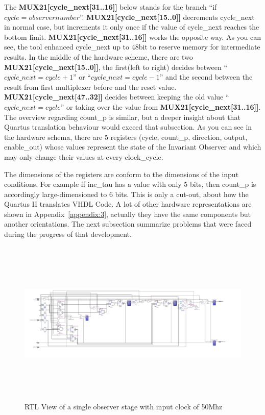 The \textbf{MUX21[cycle\_next[31..16]]} below stands for the branch ``if $cycle=observernumber$''. 
\textbf{MUX21[cycle\_next[15..0]]} decrements cycle\_next in normal case, but increments it only once if the value of cycle\_next reaches the bottom limit. 
\textbf{MUX21[cycle\_next[31..16]]} works the opposite way. 
As you can see, the tool enhanced cycle\_next up to 48bit to reserve memory for intermediate results.
In the middle of the hardware scheme, there are two \textbf{MUX21[cycle\_next[15..0]]}, 
the first(left to right) decides between  ``$cycle\_next=cycle+1$'' or ``$cycle\_next=cycle-1$'' and the second 
between the result from first multiplexer before and the reset value. \textbf{MUX21[cycle\_next[47..32]]} decides between keeping the old value ``$cycle\_next=cycle$'' or 
taking over the value from \textbf{MUX21[cycle\_next[31..16]]}. 
The overview regarding count\_p is similar, but a deeper insight about that Quartus translation behaviour would exceed that subsection. 
As you can see in the hardware schema, there are 5 registers (cycle, count\_p, direction, output, enable\_out) 
whose values represent the state of the Invariant Observer and which may only change their values at every clock\_cycle. 

The dimensions of the registers are conform to the dimensions of the input conditions. 
For example if inc\_tau has a value with only 5 bits, then count\_p is accordingly large-dimensioned to 6 bits. 
This is only a cut-out, about how the Quartus II translates VHDL Code. 
A lot of other hardware representations are shown in Appendix~\ref{appendix:3}, actually they have the same components but another orientations. 
The next subsection summarize problems that were faced during the progress of that development. 

\begin{figure}[]
\centering
\includegraphics[width=650px,height=300px,angle=-90]{../../pictures/22.02.2014/onlyObserver/OBS_50M.jpg}
\caption[RTL View of Observer 0 with clock 50Mhz]{RTL View of a single observer stage with input clock of 50Mhz}
\label{fig:test:only:50:obs0}
\end{figure}

